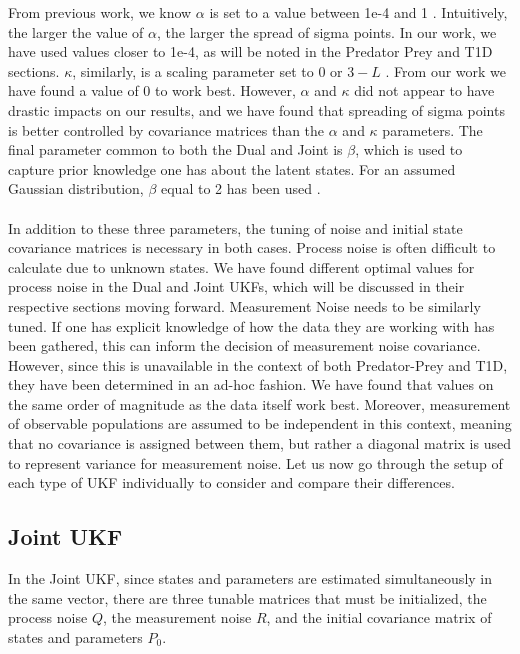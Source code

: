 \documentclass{article}
\begin{document}
From previous work, we know $\alpha$ is set to a value between 1e-4 and 1 \cite{VanMereChapter}. Intuitively, the larger the value of $\alpha$, the larger the spread of sigma points. In our work, we have used values closer to 1e-4, as will be noted in the Predator Prey and T1D sections. $\kappa$, similarly, is a scaling parameter set to 0 or $3 - L$ \cite{VanMereChapter}. From our work we have found a value of 0 to work best. However, $\alpha$ and $\kappa$ did not appear to have drastic impacts on our results, and we have found that spreading of sigma points is better controlled by covariance matrices than the $\alpha$ and $\kappa$ parameters. The final parameter common to both the Dual and Joint is $\beta$, which is used to capture prior knowledge one has about the latent states. For an assumed Gaussian distribution, $\beta$ equal to 2 has been used \cite{GoveHollingerDual}.\\
\\
In addition to these three parameters, the tuning of noise and initial state covariance matrices is necessary in both cases. Process noise is often difficult to calculate due to unknown states. We have found different optimal values for process noise in the Dual and Joint UKFs, which will be discussed in their respective sections moving forward. Measurement Noise needs to be similarly tuned. If one has explicit knowledge of how the data they are working with has been gathered, this can inform the decision of measurement noise covariance. However, since this is unavailable in the context of both Predator-Prey and T1D, they have been determined in an ad-hoc fashion. We have found that values on the same order of magnitude as the data itself work best. Moreover, measurement of observable populations are assumed to be independent in this context, meaning that no covariance is assigned between them, but rather a diagonal matrix is used to represent variance for measurement noise. Let us now go through the setup of each type of UKF individually to consider and compare their differences.


\subsection{Joint UKF}

In the Joint UKF, since states and parameters are estimated simultaneously in the same vector, there are three tunable matrices that must be initialized, the process noise $Q$, the measurement noise $R$, and the initial covariance matrix of states and parameters $P_0$. 
\end{document}
